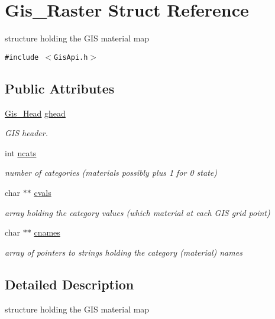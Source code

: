\hypertarget{structGis__Raster}{
\section{Gis\_\-Raster Struct Reference}
\label{structGis__Raster}
}
structure holding the GIS material map  


{\tt \#include $<$Gis\-Api.h$>$}

\subsection*{Public Attributes}
\begin{CompactItemize}
\item 
\hyperlink{structGis__Head}{Gis\_\-Head} \hyperlink{structGis__Raster_o0}{ghead}
\begin{CompactList}\small\item\em GIS header. \item\end{CompactList}\item 
int \hyperlink{structGis__Raster_o1}{ncats}
\begin{CompactList}\small\item\em number of categories (materials possibly plus 1 for 0 state) \item\end{CompactList}\item 
char $\ast$$\ast$ \hyperlink{structGis__Raster_o2}{cvals}
\begin{CompactList}\small\item\em array holding the category values (which material at each GIS grid point) \item\end{CompactList}\item 
char $\ast$$\ast$ \hyperlink{structGis__Raster_o3}{cnames}
\begin{CompactList}\small\item\em array of pointers to strings holding the category (material) names \item\end{CompactList}\end{CompactItemize}


\subsection{Detailed Description}
structure holding the GIS material map 



